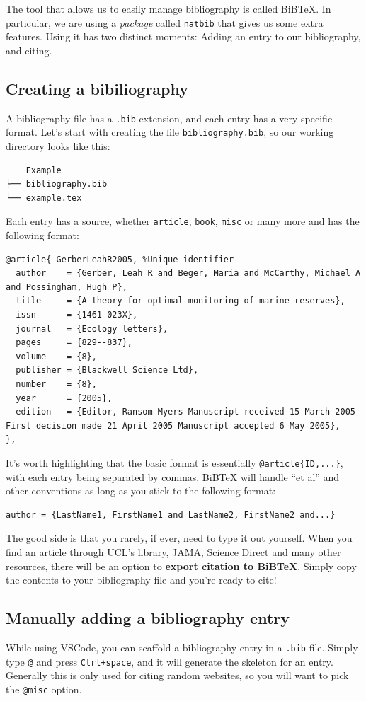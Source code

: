 The tool that allows us to easily manage bibliography is called BiBTeX. In particular, we are using a \emph{package} called \verb|natbib| that gives us some extra features.
Using it has two distinct moments: Adding an entry to our bibliography, and citing.

\clearpage
\subsection{Creating a bibiliography}
A bibliography file has a \verb|.bib| extension, and each entry has a very specific format.
Let's start with creating the file \verb|bibliography.bib|, so our working directory looks like this:
\begin{verbatim}
    Example
├── bibliography.bib
└── example.tex
\end{verbatim}

Each entry has a source, whether \verb|article|, \verb|book|, \verb|misc| or many more and has the following format:
\begin{lstlisting}
@article{ GerberLeahR2005, %Unique identifier
  author    = {Gerber, Leah R and Beger, Maria and McCarthy, Michael A and Possingham, Hugh P},
  title     = {A theory for optimal monitoring of marine reserves},
  issn      = {1461-023X},
  journal   = {Ecology letters},
  pages     = {829--837},
  volume    = {8},
  publisher = {Blackwell Science Ltd},
  number    = {8},
  year      = {2005},
  edition   = {Editor, Ransom Myers Manuscript received 15 March 2005 First decision made 21 April 2005 Manuscript accepted 6 May 2005},
},
\end{lstlisting}

It's worth highlighting that the basic format is essentially \verb|@article{ID,...}|, with each entry being separated by commas.
BiBTeX will handle ``et al'' and other conventions as long as you stick to the following format:
\begin{lstlisting}
author = {LastName1, FirstName1 and LastName2, FirstName2 and...}
\end{lstlisting}

The good side is that you rarely, if ever, need to type it out yourself.
When you find an article through UCL's library, JAMA, Science Direct and many other resources, there will be an option to \textbf{export citation to BiBTeX}.
Simply copy the contents to your bibliography file and you're ready to cite!

\subsection{Manually adding a bibliography entry}
While using VSCode, you can scaffold a bibliography entry in a \verb|.bib| file.
Simply type \verb|@| and press \verb|Ctrl+space|, and it will generate the skeleton for an entry.
Generally this is only used for citing random websites, so you will want to pick the \verb|@misc| option.

